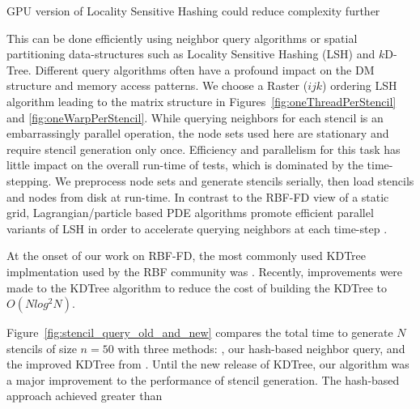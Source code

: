 \documentclass{report}
\begin{document}
GPU version of Locality Sensitive Hashing could reduce complexity further \cite{Pan2011}

This can be done efficiently using neighbor query algorithms or spatial partitioning data-structures such as Locality Sensitive Hashing (LSH) and $k$D-Tree. Different query algorithms often have a profound impact on the DM structure and memory access patterns. We choose a Raster ($ijk$) ordering LSH algorithm \cite{Bollig2011} leading to the matrix structure in Figures~\ref{fig:oneThreadPerStencil} and \ref{fig:oneWarpPerStencil}. While querying neighbors for each stencil is an embarrassingly parallel operation, the node sets used here are stationary and require stencil generation only once. Efficiency and parallelism for this task has little impact on the overall run-time of tests, which is dominated by the time-stepping. We preprocess node sets and generate stencils serially, then load stencils and nodes from disk at run-time. In contrast to the RBF-FD view of a static grid, Lagrangian/particle based PDE algorithms promote efficient parallel variants of LSH in order to accelerate querying neighbors at each time-step \cite{Pan2011, Goswami2010}. 


At the onset of our work on RBF-FD, the most commonly used KDTree implmentation used by the RBF community was \cite{Tagliasacchi2008}. Recently, improvements were made to the KDTree algorithm to reduce the cost of building the KDTree to $O(N log^2 N)$. 

Figure~\ref{fig:stencil_query_old_and_new} compares the total time to generate $N$ stencils of size $n=50$ with three methods: \cite{Tagliasacchi2008}, our hash-based neighbor query, and the improved KDTree from \cite{Tagliasacchi2012}. 
Until the new release of KDTree, our algorithm was a major improvement to the performance of stencil generation. The hash-based approach achieved greater than 



\end{document}
